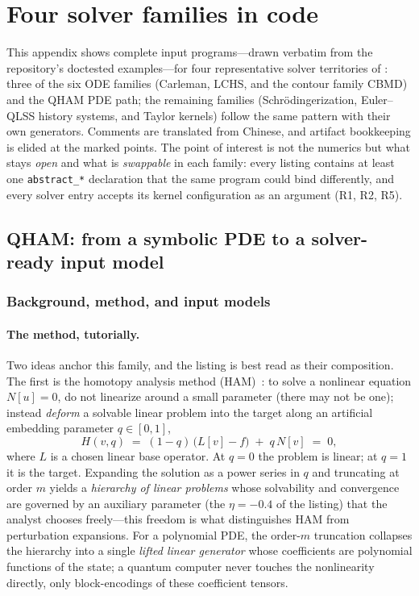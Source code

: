 \section{Four solver families in code}
\label{app:families}

This appendix shows complete input programs---drawn verbatim from the
repository's doctested examples---for four representative solver
territories of : three of the six ODE families
(Carleman, LCHS, and the contour family CBMD) and the QHAM PDE path; the
remaining families (Schr\"odingerization, Euler--QLSS history systems,
and Taylor kernels) follow the same pattern with their own generators.
Comments are translated from Chinese, and artifact bookkeeping is elided
at the marked points.  The point of
interest is not the numerics but what stays \emph{open} and what is
\emph{swappable} in each family: every listing contains at least one
\texttt{abstract\_*} declaration that the same program could bind
differently, and every solver entry accepts its kernel configuration as an
argument (R1, R2, R5).

\subsection{QHAM: from a symbolic PDE to a solver-ready input model}
\label{app:qham}

\subsubsection{Background, method, and input models}
\label{app:qham-method}

\paragraph{The method, tutorially.}
Two ideas anchor this family, and the listing is best read as their
composition.  The first is the homotopy analysis method
(HAM)~\cite{liao2003beyond,liao2012homotopy}: to solve a nonlinear
equation $N[u]=0$, do not linearize around a small parameter (there may
not be one); instead \emph{deform} a solvable linear problem into the
target along an artificial embedding parameter $q\in[0,1]$,
\[
H(v,q) \;=\; (1-q)\,\bigl(L[v]-f\bigr) \;+\; q\,N[v] \;=\; 0 ,
\]
where $L$ is a chosen linear base operator.  At $q=0$ the problem is
linear; at $q=1$ it is the target.  Expanding the solution as a power
series in $q$ and truncating at order $m$ yields a \emph{hierarchy of
linear problems} whose solvability and convergence are governed by an
auxiliary parameter (the $\eta=-0.4$ of the listing) that the analyst
chooses freely---this freedom is what distinguishes HAM from perturbation
expansions.  For a polynomial PDE, the order-$m$ truncation collapses the
hierarchy into a single \emph{lifted linear generator} whose coefficients
are polynomial functions of the state; a quantum computer never touches
the nonlinearity directly, only block-encodings of these coefficient
tensors.

